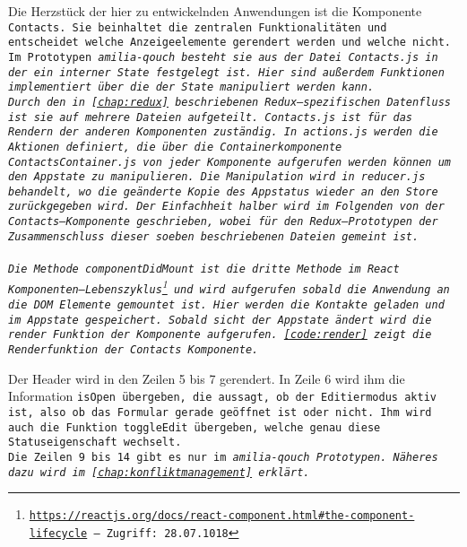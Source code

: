 Die Herzstück der hier zu entwickelnden Anwendungen ist die Komponente \tt{Contacts}.
Sie beinhaltet die zentralen Funktionalitäten und entscheidet welche Anzeigeelemente gerendert werden und welche nicht.
Im Prototypen \it{amilia-qouch} besteht sie aus der Datei \tt{Contacts.js} in der ein interner State festgelegt ist.
Hier sind außerdem Funktionen implementiert über die der State manipuliert werden kann.\\
%
Durch den in \autoref{chap:redux} beschriebenen Redux--spezifischen Datenfluss ist sie auf mehrere Dateien aufgeteilt.
\tt{Contacts.js} ist für das Rendern der anderen Komponenten zuständig. 
In \tt{actions.js} werden die Aktionen definiert, die über die Containerkomponente \tt{ContactsContainer.js} von jeder Komponente aufgerufen werden können um den \gls{App}state zu manipulieren.
Die Manipulation wird in \tt{reducer.js} behandelt, wo die geänderte Kopie des \gls{App}status wieder an den Store zurückgegeben wird.
Der Einfachheit halber wird im Folgenden von der Contacts--Komponente geschrieben, wobei für den Redux--Prototypen der Zusammenschluss dieser soeben beschriebenen Dateien gemeint ist.\\\\
%
% 
Die Methode \tt{componentDidMount} ist die dritte Methode im React Komponenten--Lebenszyklus\footnote{ \url{https://reactjs.org/docs/react-component.html\#the-component-lifecycle} -- Zugriff: 28.07.1018} und wird aufgerufen sobald die Anwendung an die DOM Elemente gemountet ist.
Hier werden die Kontakte geladen und im \gls{App}state gespeichert.
Sobald sicht der \gls{App}state ändert wird die \tt{render} Funktion der Komponente aufgerufen. \autoref{code:render} zeigt die Renderfunktion der \tt{Contacts} Komponente.
%
\begin{center}
  
\end{center}
%
Der Header wird in den Zeilen 5 bis 7 gerendert.
In Zeile 6 wird ihm die Information \tt{isOpen} übergeben, die aussagt, ob der Editiermodus aktiv ist, also ob das Formular gerade geöffnet ist oder nicht.
Ihm wird auch die Funktion \tt{toggleEdit} übergeben, welche genau diese Statuseigenschaft wechselt.\\
%
Die Zeilen 9 bis 14 gibt es nur im \it{amilia-qouch} Prototypen. Näheres dazu wird im \autoref{chap:konfliktmanagement} erklärt.\\

